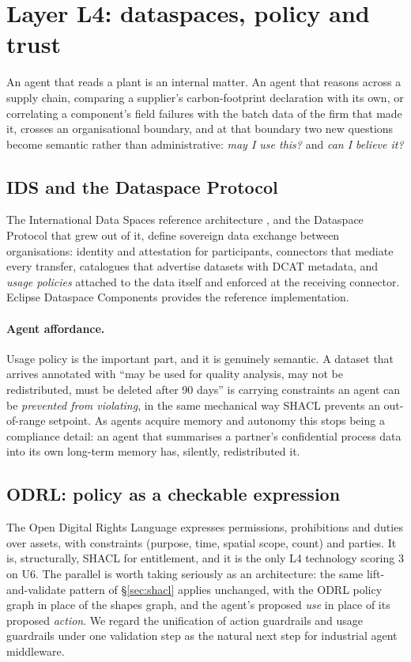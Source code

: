 \section{Layer L4: dataspaces, policy and trust}
\label{sec:layer4}

An agent that reads a plant is an internal matter. An agent that reasons across
a supply chain, comparing a supplier's carbon-footprint declaration with its
own, or correlating a component's field failures with the batch data of the firm
that made it, crosses an organisational boundary, and at that boundary two new
questions become semantic rather than administrative: \emph{may I use this?} and
\emph{can I believe it?}

\subsection{IDS and the Dataspace Protocol}

The International Data Spaces reference architecture \cite{idsa2022ram}, and the
Dataspace Protocol that grew out of it, define sovereign data exchange between
organisations:
identity and attestation for participants, connectors that mediate every
transfer, catalogues that advertise datasets with DCAT metadata, and
\emph{usage policies} attached to the data itself and enforced at the receiving
connector. Eclipse Dataspace Components provides the reference implementation.

\paragraph{Agent affordance.} Usage policy is the important part, and it is
genuinely semantic. A dataset that arrives annotated with ``may be used for
quality analysis, may not be redistributed, must be deleted after 90 days'' is
carrying constraints an agent can be \emph{prevented from violating}, in the
same mechanical way SHACL prevents an out-of-range setpoint. As agents acquire
memory and autonomy this stops being a compliance detail: an agent that
summarises a partner's confidential process data into its own long-term memory
has, silently, redistributed it.

\subsection{ODRL: policy as a checkable expression}

The Open Digital Rights Language \cite{w3c2018odrl} expresses permissions,
prohibitions and duties over assets, with constraints (purpose, time, spatial
scope, count) and parties.
It is, structurally, SHACL for entitlement, and it is the only L4 technology
scoring $3$ on U6. The parallel is worth taking seriously as an architecture:
the same lift-and-validate pattern of \S\ref{sec:shacl} applies unchanged, with
the ODRL policy graph in place of the shapes graph, and the agent's proposed
\emph{use} in place of its proposed \emph{action}. We regard the unification of
action guardrails and usage guardrails under one validation step as the natural
next step for industrial agent middleware.


